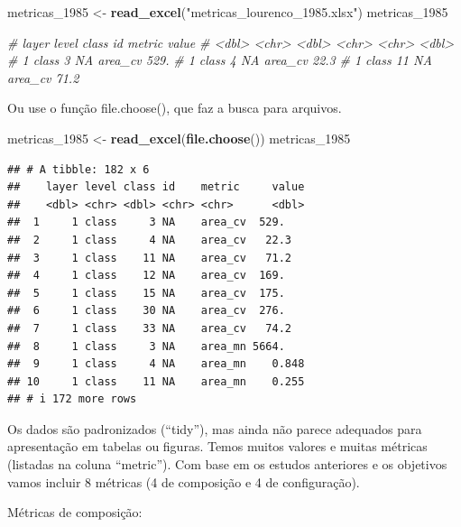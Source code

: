 \documentclass[
]{article}
\newenvironment{Shaded}{\begin{snugshade}}{\end{snugshade}}
\newcommand{\CommentTok}[1]{\textcolor[rgb]{0.56,0.35,0.01}{\textit{#1}}}
\newcommand{\FunctionTok}[1]{\textcolor[rgb]{0.13,0.29,0.53}{\textbf{#1}}}
\newcommand{\NormalTok}[1]{#1}
\newcommand{\OtherTok}[1]{\textcolor[rgb]{0.56,0.35,0.01}{#1}}
\newcommand{\StringTok}[1]{\textcolor[rgb]{0.31,0.60,0.02}{#1}}
\begin{document}
\begin{Shaded}
\begin{Highlighting}[]
\NormalTok{metricas\_1985 }\OtherTok{\textless{}{-}} \FunctionTok{read\_excel}\NormalTok{(}\StringTok{"metricas\_lourenco\_1985.xlsx"}\NormalTok{)}
\NormalTok{metricas\_1985}

\CommentTok{\#  layer level class id    metric     value}
\CommentTok{\#   \textless{}dbl\textgreater{} \textless{}chr\textgreater{} \textless{}dbl\textgreater{} \textless{}chr\textgreater{} \textless{}chr\textgreater{}      \textless{}dbl\textgreater{}}
\CommentTok{\#     1 class     3 NA    area\_cv  529.   }
\CommentTok{\#     1 class     4 NA    area\_cv   22.3  }
\CommentTok{\#     1 class    11 NA    area\_cv   71.2  }
\end{Highlighting}
\end{Shaded}

Ou use o função file.choose(), que faz a busca
para arquivos.

\begin{Shaded}
\begin{Highlighting}[]
\NormalTok{metricas\_1985 }\OtherTok{\textless{}{-}} \FunctionTok{read\_excel}\NormalTok{(}\FunctionTok{file.choose}\NormalTok{())}
\NormalTok{metricas\_1985}
\end{Highlighting}
\end{Shaded}

\begin{verbatim}
## # A tibble: 182 x 6
##    layer level class id    metric     value
##    <dbl> <chr> <dbl> <chr> <chr>      <dbl>
##  1     1 class     3 NA    area_cv  529.   
##  2     1 class     4 NA    area_cv   22.3  
##  3     1 class    11 NA    area_cv   71.2  
##  4     1 class    12 NA    area_cv  169.   
##  5     1 class    15 NA    area_cv  175.   
##  6     1 class    30 NA    area_cv  276.   
##  7     1 class    33 NA    area_cv   74.2  
##  8     1 class     3 NA    area_mn 5664.   
##  9     1 class     4 NA    area_mn    0.848
## 10     1 class    11 NA    area_mn    0.255
## # i 172 more rows
\end{verbatim}

Os dados são padronizados (``tidy''), mas ainda não parece adequados para apresentação em tabelas ou figuras.
Temos muitos valores e muitas métricas (listadas na coluna ``metric'').
Com base em os estudos anteriores e os objetivos vamos incluir 8 métricas
(4 de composição e 4 de configuração).

Métricas de composição:
\end{document}
